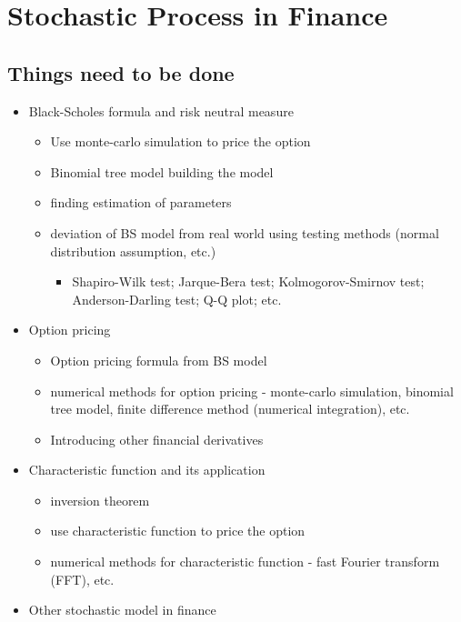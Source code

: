 \documentclass[
  letterpaper,
  DIV=11,
  numbers=noendperiod]{scrreprt}
\providecommand{\tightlist}{%
  \setlength{\itemsep}{0pt}\setlength{\parskip}{0pt}}
\theoremstyle{definition}
\theoremstyle{plain}
\theoremstyle{plain}
\theoremstyle{definition}
\theoremstyle{plain}
\theoremstyle{plain}
\theoremstyle{remark}
\begin{document}
\part{Stochastic Process in Finance}

\chapter{Things need to be done}\label{things-need-to-be-done}

\begin{itemize}
\tightlist
\item
  Black-Scholes formula and risk neutral measure

  \begin{itemize}
  \tightlist
  \item
    Use monte-carlo simulation to price the option
  \item
    Binomial tree model building the model
  \item
    finding estimation of parameters
  \item
    deviation of BS model from real world using testing methods (normal
    distribution assumption, etc.)

    \begin{itemize}
    \tightlist
    \item
      Shapiro-Wilk test; Jarque-Bera test; Kolmogorov-Smirnov test;
      Anderson-Darling test; Q-Q plot; etc.
    \end{itemize}
  \end{itemize}
\item
  Option pricing

  \begin{itemize}
  \tightlist
  \item
    Option pricing formula from BS model
  \item
    numerical methods for option pricing - monte-carlo simulation,
    binomial tree model, finite difference method (numerical
    integration), etc.
  \item
    Introducing other financial derivatives
  \end{itemize}
\item
  Characteristic function and its application

  \begin{itemize}
  \tightlist
  \item
    inversion theorem
  \item
    use characteristic function to price the option
  \item
    numerical methods for characteristic function - fast Fourier
    transform (FFT), etc.
  \end{itemize}
\item
  Other stochastic model in finance


\end{itemize}
\end{document}
